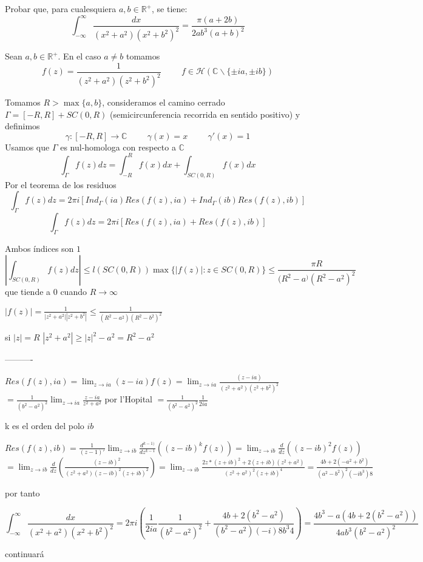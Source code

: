 \begin{ejer}
	Probar que, para cualesquiera $a,b\in\mathbb{R}^+$, se tiene:
	$$ \int_{-\infty}^{\infty} \frac{dx}{(x^2+a^2)(x^2+b^2)^2} = \frac{\pi (a+2b)}{2ab^3(a+b)^2} $$
\end{ejer}
\begin{sol}
Sean $a,b\in\mathbb{R}^+$.
En el caso $a\not = b$ tomamos $$f(z) = \frac{1}{(z^2+a^2)(z^2+b^2)^2} \hspace{1cm} f\in\mathcal{H}( \mathbb{C}\backslash\{ \pm ia, \pm ib \} )$$

Tomamos $R>\max\{a,b\}$, consideramos el camino cerrado $\Gamma = [-R,R]+SC(0,R)$ (semicircunferencia recorrida en sentido positivo) y definimos
$$\gamma : [-R,R]\rightarrow \mathbb{C} \hspace{1cm} \gamma(x)=x \hspace{1cm} \gamma '(x) = 1$$
Usamos que $\Gamma$ es nul-homologa con respecto a $\mathbb{C}$
$$\int_{\Gamma}f(z)dz = \int_{-R}^{R} f(x)dx + \int_{SC(0,R)} f(x)dx$$
Por el teorema de los residuos 
$$\int_{\Gamma}f(z)dz = 2\pi i [ Ind_{\Gamma}(ia)Res(f(z),ia) + Ind_{\Gamma}(ib)Res(f(z),ib) ]$$
$$\int_{\Gamma}f(z)dz = 2\pi i [Res(f(z),ia) + Res(f(z),ib) ]$$

Ambos índices son $1$
$$|\int_{SC(0,R)} f(z)dz| \leq l(SC(0,R))\max \{ |f(z)| : z\in SC(0,R) \} \leq \frac{\pi R}{(R^2-a^)(R^2-a^2)^2}$$
que tiende a $0$ cuando $R\rightarrow \infty$

$|f(z)| = \frac{1}{|z^2+a^2||z^2+b^2|} \leq \frac{1}{(R^2-a^2)(R^2-b^2)^2}$

si $|z|=R$
$|z^2+a^2| \geq |z|^2 -a^2 = R^2-a^2$

----------

$Res(f(z),ia) = \lim_{z\rightarrow ia} (z-ia)f(z) = \lim_{z\rightarrow ia} \frac{(z-ia)}{(z^2+a^2)(z^2+b^2)^2} $
$= \frac{1}{(b^2-a^2)^2} \lim_{z\rightarrow ia} \frac{z-ia}{z^2+a^2}$ 
por l'Hopital
$= \frac{1}{(b^2-a^2)^2}\frac{1}{2ia}$

k es el orden del polo $ib$

$Res(f(z),ib) = \frac{1}{(z-1)'} \lim_{z\rightarrow ib} \frac{d^{k-1)}}{dz^{k-1}} ((z-ib)^k f(z)) = \lim_{z\rightarrow ib} \frac{d}{dz} ((z-ib)^2 f(z)) $
$= \lim_{z\rightarrow ib} \frac{d}{dz} \left( \frac{(z-ib)^2}{(z^2+a^2)(z-ib)^2(z+ib)^2}  \right) 
= \lim_{z\rightarrow ib}\frac{2z*(z+ib)^2 + 2(z+ib)(z^2+a^2)}{(z^2+a^2)^2 (z+ib)^4}
= \frac{4b + 2(-a^2+b^2)}{(a^2-b^2)^2 (-ib^3)8}  $

por tanto

$$ \int_{-\infty}^{\infty} \frac{dx}{(x^2+a^2)(x^2+b^2)^2} = 
2\pi i \left( \frac{1}{2ia}\frac{1}{(b^2-a^2)^2} + \frac{4b+2(b^2-a^2)}{(b^2-a^2)(-i)8b^3 4} \right) =
\frac{4b^3-a(4b+2(b^2-a^2))}{4ab^3(b^2-a^2)^2}$$

continuará

\end{sol}



